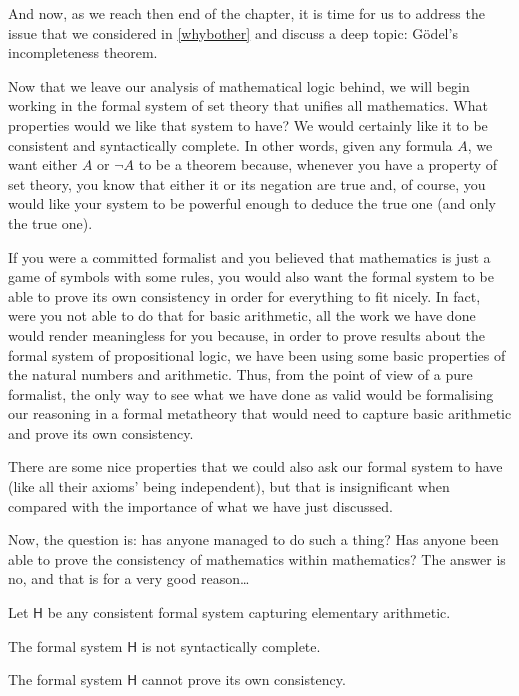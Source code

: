 \begin{para}
And now, as we reach then end of the chapter, it is time for us to address the issue that we considered in \ref{whybother} and discuss a deep topic: G\"odel's incompleteness theorem.

Now that we leave our analysis of mathematical logic behind, we will begin working in the formal system of set theory that unifies all mathematics. What properties would we like that system to have?
We would certainly like it to be consistent and syntactically complete.
In other words, given any formula $A$, we want either $A$ or $\lnot A$ to be a theorem because, whenever you have a property of set theory, you know that either it or its negation are true and, of course, you would like your system to be powerful enough to deduce the true one (and only the true one).

If you were a committed formalist and you believed that mathematics is just a game of symbols with some rules, you would also want the formal system to be able to prove its own consistency in order for everything to fit nicely.
In fact, were you not able to do that for basic arithmetic, all the work we have done would render meaningless for you because, in order to prove results about the formal system of propositional logic, we have been using some basic properties of the natural numbers and arithmetic.
Thus, from the point of view of a pure formalist, the only way to see what we have done as valid would be formalising our reasoning in a formal metatheory that would need to capture basic arithmetic and prove its own consistency.

There are some nice properties that we could also ask our formal system to have (like all their axioms' being independent), but that is insignificant when compared with the importance of what we have just discussed.

Now, the question is: has anyone managed to do such a thing? Has anyone been able to prove the consistency of mathematics within mathematics? The answer is no, and that is for a very good reason\ldots
\end{para}

\begin{theorem}
Let $\mathsf{H}$ be any consistent formal system capturing elementary arithmetic.
\begin{statements}
\item The formal system $\mathsf{H}$ is not syntactically complete.
\item The formal system $\mathsf{H}$ cannot prove its own consistency. 
\end{statements}
\label{<+label+>}
\end{theorem}

